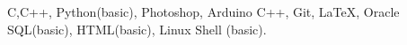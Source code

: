 
C,C++, Python(basic), Photoshop, Arduino C++, Git, \LaTeX, Oracle SQL(basic), HTML(basic), Linux Shell (basic).
